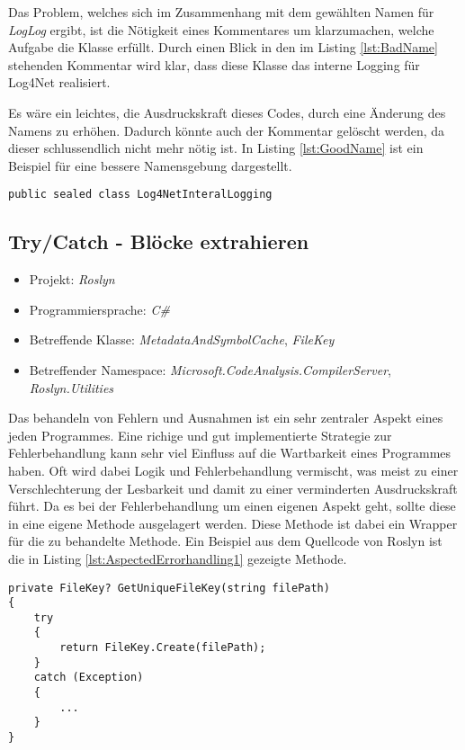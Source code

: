 \SuperPar Das Problem, welches sich im Zusammenhang mit dem gewählten Namen für \textit{LogLog} ergibt, ist die Nötigkeit eines Kommentares um klarzumachen, welche  Aufgabe die Klasse erfüllt. Durch einen Blick in den im Listing \ref{lst:BadName} stehenden Kommentar wird klar, dass diese Klasse das interne Logging für Log4Net realisiert. 

Es wäre ein leichtes, die Ausdruckskraft dieses Codes, durch eine Änderung des Namens zu erhöhen. Dadurch könnte auch der Kommentar gelöscht werden, da dieser schlussendlich nicht mehr nötig ist. In Listing \ref{lst:GoodName} ist ein Beispiel für eine bessere Namensgebung dargestellt.

\begin{lstlisting}[language={[Sharp]C}, caption=Beispiele für bessere Namensgebung, label=lst:GoodName]
	public sealed class Log4NetInteralLogging
\end{lstlisting}

\subsection{Try/Catch - Blöcke extrahieren}
\begin{itemize}
	\item Projekt: \textit{Roslyn}
	\item Programmiersprache: \textit{C\#}
	\item Betreffende Klasse: \textit{MetadataAndSymbolCache}, \textit{FileKey}
	\item Betreffender Namespace: \textit{Microsoft.CodeAnalysis.CompilerServer}, \textit{Roslyn.Utilities}
\end{itemize}

\SuperPar Das behandeln von Fehlern und Ausnahmen ist ein sehr zentraler Aspekt eines jeden Programmes. Eine richige und gut implementierte Strategie zur Fehlerbehandlung kann sehr viel Einfluss auf die Wartbarkeit eines Programmes haben. Oft wird dabei Logik und Fehlerbehandlung vermischt, was meist zu einer Verschlechterung der Lesbarkeit und damit zu einer verminderten Ausdruckskraft führt. Da es bei der Fehlerbehandlung um einen eigenen Aspekt geht, sollte diese in eine eigene Methode ausgelagert werden. Diese Methode ist dabei ein Wrapper für die zu behandelte Methode. Ein Beispiel aus dem Quellcode von Roslyn ist die in Listing \ref{lst:AspectedErrorhandling1} gezeigte Methode.

\begin{lstlisting}[language={[Sharp]C}, caption=Beispiele für getrennten Aspket der Fehlerbehandlung, label=lst:AspectedErrorhandling1]
private FileKey? GetUniqueFileKey(string filePath)
{
	try
	{
		return FileKey.Create(filePath);
	}
	catch (Exception)
	{
		...
	}
}
\end{lstlisting}

